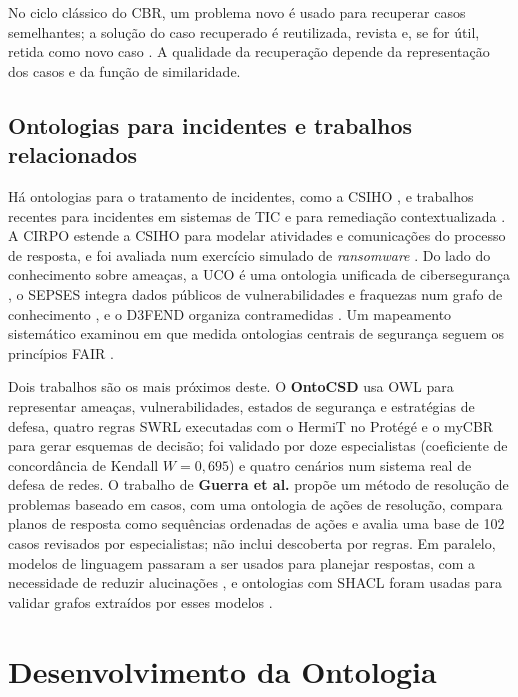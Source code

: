 \documentclass[12pt]{article}
\begin{document}
No ciclo clássico do CBR, um problema novo é usado para recuperar casos semelhantes; a solução do caso recuperado é reutilizada, revista e, se for útil, retida como novo caso \cite{aamodt1994}. A qualidade da recuperação depende da representação dos casos e da função de similaridade.

\subsection{Ontologias para incidentes e trabalhos relacionados}

Há ontologias para o tratamento de incidentes, como a CSIHO \cite{moreira2018csiho}, e trabalhos recentes para incidentes em sistemas de TIC e para remediação contextualizada \cite{tailhardat2024noria,kanawati2026}. A CIRPO estende a CSIHO para modelar atividades e comunicações do processo de resposta, e foi avaliada num exercício simulado de \emph{ransomware} \cite{galadima2026cirpo}. Do lado do conhecimento sobre ameaças, a UCO é uma ontologia unificada de cibersegurança \cite{syed2016uco}, o SEPSES integra dados públicos de vulnerabilidades e fraquezas num grafo de conhecimento \cite{kiesling2019}, e o D3FEND organiza contramedidas \cite{kaloroumakis2021d3fend}. Um mapeamento sistemático examinou em que medida ontologias centrais de segurança seguem os princípios FAIR \cite{oliveira2021fair}.

Dois trabalhos são os mais próximos deste. O \textbf{OntoCSD} \cite{wu2024ontocsd} usa OWL para representar ameaças, vulnerabilidades, estados de segurança e estratégias de defesa, quatro regras SWRL executadas com o HermiT no Protégé e o myCBR para gerar esquemas de decisão; foi validado por doze especialistas (coeficiente de concordância de Kendall $W=0{,}695$) e quatro cenários num sistema real de defesa de redes. O trabalho de \textbf{Guerra et al.} \cite{guerra2023} propõe um método de resolução de problemas baseado em casos, com uma ontologia de ações de resolução, compara planos de resposta como sequências ordenadas de ações e avalia uma base de 102 casos revisados por especialistas; não inclui descoberta por regras. Em paralelo, modelos de linguagem passaram a ser usados para planejar respostas, com a necessidade de reduzir alucinações \cite{hammar2026}, e ontologias com SHACL foram usadas para validar grafos extraídos por esses modelos \cite{cotti2026ontologx}.

\section{Desenvolvimento da Ontologia}
\label{sec:dev}
\end{document}
